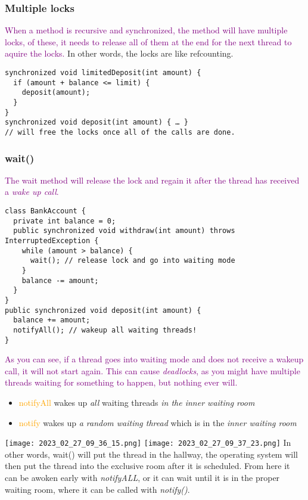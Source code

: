 \documentclass[main.tex,fontsize=8pt,paper=a4,paper=portrait,DIV=calc,]{scrartcl}
\begin{document}
\subsubsection{Multiple locks}
\textcolor{purple}{When a method is recursive and synchronized, the method will have multiple locks, of these, it needs to release all of them at the end for the next thread to aquire the locks.}\newline
In other words, the locks are like refcounting. 
\begin{lstlisting}
synchronized void limitedDeposit(int amount) {
  if (amount + balance <= limit) {
    deposit(amount);
  }
}
synchronized void deposit(int amount) { … }
// will free the locks once all of the calls are done.
\end{lstlisting}

\subsubsection{wait()}
\textcolor{purple}{The wait method will release the lock and regain it after the thread has received a \emph{wake up call}.}
\begin{lstlisting}
class BankAccount {
  private int balance = 0;
  public synchronized void withdraw(int amount) throws InterruptedException {
    while (amount > balance) {
      wait(); // release lock and go into waiting mode
    }
    balance -= amount;
  }
}
public synchronized void deposit(int amount) {
  balance += amount;
  notifyAll(); // wakeup all waiting threads!
}
\end{lstlisting}
\textcolor{purple}{As you can see, if a thread goes into waiting mode and does not receive a wakeup call, it will not start again.\newline
This can cause \emph{deadlocks}, as you might have multiple threads waiting for something to happen, but nothing ever will.}
\begin{itemize}
  \item \textcolor{orange}{notifyAll} wakes up \emph{all} waiting threads \emph{in the inner waiting room}
  \item \textcolor{orange}{notify} wakes up \emph{a random waiting thread} which is in the \emph{inner waiting room}\newline
\end{itemize} 
\texttt{[image: 2023\_02\_27\_09\_36\_15.png]}
\texttt{[image: 2023\_02\_27\_09\_37\_23.png]}
In other words, wait() will put the thread in the hallway, the operating system will then put the thread into the exclusive room after it is scheduled. From here it can be awoken early with \emph{notifyALL}, or it can wait until it is in the proper waiting room, where it can be called with \emph{notify()}.
\end{document}
